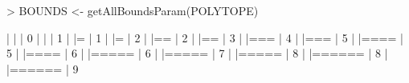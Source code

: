 \documentclass{article}
\begin{document}
\begin{Schunk}
\begin{Sinput}
> BOUNDS <- getAllBoundsParam(POLYTOPE)
\end{Sinput}
\begin{Soutput}
  |                                                                            
  |                                                                      |   0%
  |                                                                            
  |                                                                      |   1%
  |                                                                            
  |=                                                                     |   1%
  |                                                                            
  |=                                                                     |   2%
  |                                                                            
  |==                                                                    |   2%
  |                                                                            
  |==                                                                    |   3%
  |                                                                            
  |===                                                                   |   4%
  |                                                                            
  |===                                                                   |   5%
  |                                                                            
  |====                                                                  |   5%
  |                                                                            
  |====                                                                  |   6%
  |                                                                            
  |=====                                                                 |   6%
  |                                                                            
  |=====                                                                 |   7%
  |                                                                            
  |=====                                                                 |   8%
  |                                                                            
  |======                                                                |   8%
  |                                                                            
  |======                                                                |   9%

\end{Soutput}
\end{Schunk}
\end{document}
